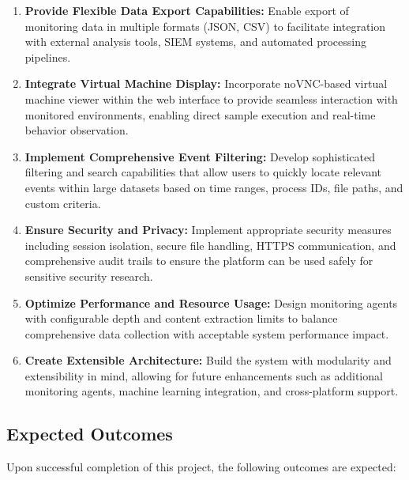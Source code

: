 \begin{enumerate}
    \item \textbf{Provide Flexible Data Export Capabilities:} Enable export of monitoring data in multiple formats (JSON, CSV) to facilitate integration with external analysis tools, SIEM systems, and automated processing pipelines.
    
    \item \textbf{Integrate Virtual Machine Display:} Incorporate noVNC-based virtual machine viewer within the web interface to provide seamless interaction with monitored environments, enabling direct sample execution and real-time behavior observation.
    
    \item \textbf{Implement Comprehensive Event Filtering:} Develop sophisticated filtering and search capabilities that allow users to quickly locate relevant events within large datasets based on time ranges, process IDs, file paths, and custom criteria.
    
    \item \textbf{Ensure Security and Privacy:} Implement appropriate security measures including session isolation, secure file handling, HTTPS communication, and comprehensive audit trails to ensure the platform can be used safely for sensitive security research.
    
    \item \textbf{Optimize Performance and Resource Usage:} Design monitoring agents with configurable depth and content extraction limits to balance comprehensive data collection with acceptable system performance impact.
    
    \item \textbf{Create Extensible Architecture:} Build the system with modularity and extensibility in mind, allowing for future enhancements such as additional monitoring agents, machine learning integration, and cross-platform support.
\end{enumerate}

\subsection*{Expected Outcomes}

Upon successful completion of this project, the following outcomes are expected:

